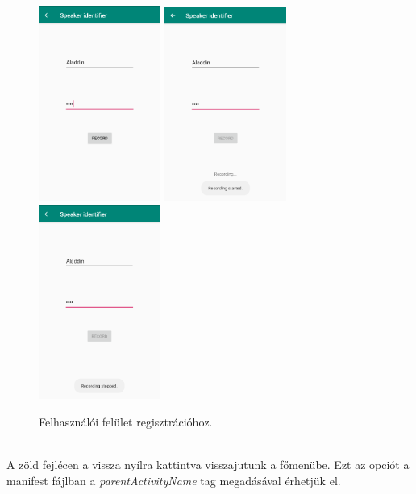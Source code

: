 \begin{figure}[!ht]
	\centering
	\includegraphics[width=40mm, keepaspectratio]{figures/app-register-screen-1.png}
	\includegraphics[width=40mm, keepaspectratio]{figures/app-register-screen-2.png}
	\includegraphics[width=40mm, keepaspectratio]{figures/app-register-screen-3.png}
	\caption{Felhasználói felület regisztrációhoz.}
	\label{fig:app-register-screen-1}
\end{figure}
\ \\
A zöld fejlécen a vissza nyílra kattintva visszajutunk a főmenübe. Ezt az opciót a manifest fájlban a \emph{parentActivityName} tag megadásával érhetjük el.

